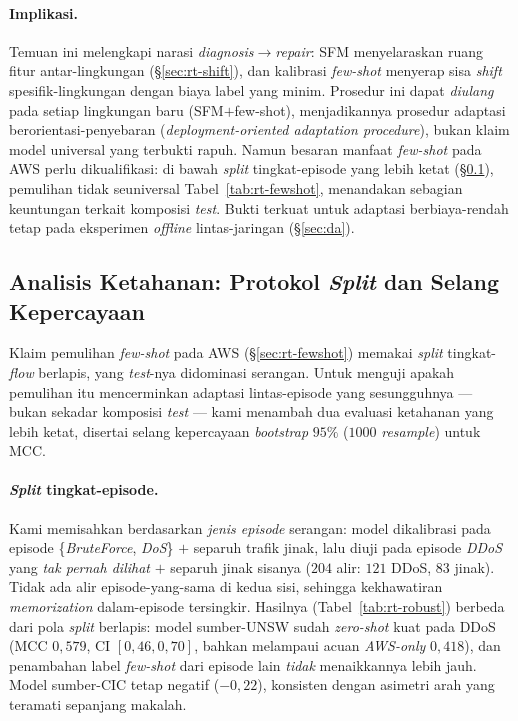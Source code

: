 \documentclass[11pt,a4paper]{article}
\begin{document}
\paragraph{Implikasi.} Temuan ini melengkapi narasi \emph{diagnosis}$\to$\emph{repair}:
SFM menyelaraskan ruang fitur antar-lingkungan (\S\ref{sec:rt-shift}), dan kalibrasi
\emph{few-shot} menyerap sisa \emph{shift} spesifik-lingkungan dengan biaya label
yang minim. Prosedur ini dapat \emph{diulang} pada setiap lingkungan baru
(SFM$+$few-shot), menjadikannya prosedur adaptasi berorientasi-penyebaran
(\emph{deployment-oriented adaptation procedure}), bukan klaim model universal yang
terbukti rapuh. Namun besaran manfaat \emph{few-shot} pada AWS perlu dikualifikasi:
di bawah \emph{split} tingkat-episode yang lebih ketat (\S\ref{sec:rt-robust}),
pemulihan tidak seuniversal Tabel~\ref{tab:rt-fewshot}, menandakan sebagian keuntungan
terkait komposisi \emph{test}. Bukti terkuat untuk adaptasi berbiaya-rendah tetap pada
eksperimen \emph{offline} lintas-jaringan (\S\ref{sec:da}).

\subsection{Analisis Ketahanan: Protokol \emph{Split} dan Selang Kepercayaan}
\label{sec:rt-robust}

Klaim pemulihan \emph{few-shot} pada AWS (\S\ref{sec:rt-fewshot}) memakai \emph{split}
tingkat-\emph{flow} berlapis, yang \emph{test}-nya didominasi serangan. Untuk menguji
apakah pemulihan itu mencerminkan adaptasi lintas-episode yang sesungguhnya --- bukan
sekadar komposisi \emph{test} --- kami menambah dua evaluasi ketahanan yang lebih ketat,
disertai selang kepercayaan \emph{bootstrap} $95\%$ ($1000$ \emph{resample}) untuk MCC.

\paragraph{\emph{Split} tingkat-episode.} Kami memisahkan berdasarkan \emph{jenis
episode} serangan: model dikalibrasi pada episode \{\emph{BruteForce}, \emph{DoS}\}
$+$ separuh trafik jinak, lalu diuji pada episode \emph{DDoS} yang \emph{tak pernah
dilihat} $+$ separuh jinak sisanya ($204$ alir: $121$ DDoS, $83$ jinak). Tidak ada alir
episode-yang-sama di kedua sisi, sehingga kekhawatiran \emph{memorization} dalam-episode
tersingkir. Hasilnya (Tabel~\ref{tab:rt-robust}) berbeda dari pola \emph{split} berlapis:
model sumber-UNSW sudah \emph{zero-shot} kuat pada DDoS (MCC $0{,}579$, CI $[0{,}46,0{,}70]$,
bahkan melampaui acuan \emph{AWS-only} $0{,}418$), dan penambahan label \emph{few-shot}
dari episode lain \emph{tidak} menaikkannya lebih jauh. Model sumber-CIC tetap negatif
($-0{,}22$), konsisten dengan asimetri arah yang teramati sepanjang makalah.
\end{document}
